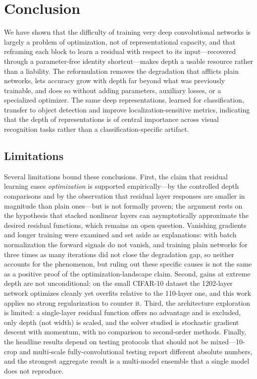 \section{Conclusion}
\label{sec:conclusion}
We have shown that the difficulty of training very deep convolutional networks is largely a
problem of optimization, not of representational capacity, and that reframing each block to
learn a residual with respect to its input---recovered through a parameter-free identity
shortcut---makes depth a usable resource rather than a liability. The reformulation removes
the degradation that afflicts plain networks, lets accuracy grow with depth far beyond what
was previously trainable, and does so without adding parameters, auxiliary losses, or a
specialized optimizer. The same deep representations, learned for classification, transfer
to object detection and improve localization-sensitive metrics, indicating that the depth of
representations is of central importance across visual recognition tasks rather than a
classification-specific artifact.

\subsection*{Limitations}
Several limitations bound these conclusions. First, the claim that residual learning eases
\emph{optimization} is supported empirically---by the controlled depth comparisons and by the
observation that residual layer responses are smaller in magnitude than plain ones---but is
not formally proven; the argument rests on the hypothesis that stacked nonlinear layers can
asymptotically approximate the desired residual functions, which remains an open question.
Vanishing gradients and longer training were examined and set aside as explanations: with
batch normalization the forward signals do not vanish, and training plain networks for three
times as many iterations did not close the degradation gap, so neither accounts for the
phenomenon, but ruling out these specific causes is not the same as a positive proof of the
optimization-landscape claim. Second, gains at extreme depth are not unconditional: on the
small CIFAR-10 dataset the 1202-layer network optimizes cleanly yet overfits relative to the
110-layer one, and this work applies no strong regularization to counter it. Third, the
architecture exploration is limited: a single-layer residual function offers no advantage and
is excluded, only depth (not width) is scaled, and the solver studied is stochastic gradient
descent with momentum, with no comparison to second-order methods. Finally, the headline
results depend on testing protocols that should not be mixed---10-crop and multi-scale
fully-convolutional testing report different absolute numbers, and the strongest aggregate
result is a multi-model ensemble that a single model does not reproduce.

